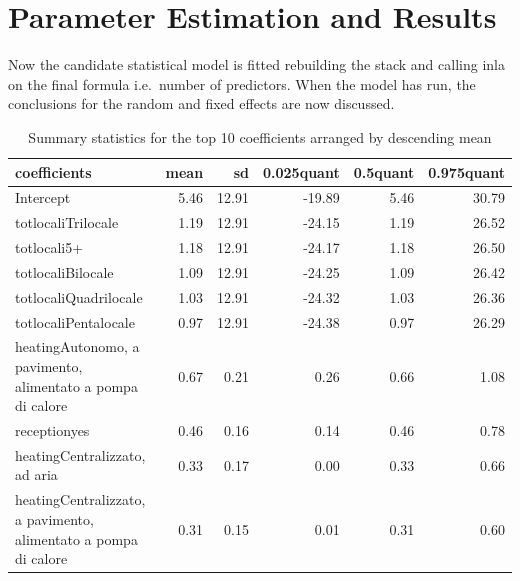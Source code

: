 \documentclass[
  12pt,
  a4paper,
  oneside]{book}
\theoremstyle{definition}
\theoremstyle{definition}
\theoremstyle{definition}
\theoremstyle{remark}
\begin{document}
\hypertarget{fit}{%
\section{Parameter Estimation and Results}\label{fit}}

Now the candidate statistical model is fitted rebuilding the stack and calling inla on the final formula i.e.~number of predictors. When the model has run, the conclusions for the random and fixed effects are now discussed.

\begin{table}

\caption{\label{tab:modelfitting}Summary statistics for the top 10 coefficients arranged by descending mean}
\centering
\begin{tabular}[t]{lrrrrr}
\toprule
coefficients & mean & sd & 0.025quant & 0.5quant & 0.975quant\\
\midrule
Intercept & 5.46 & 12.91 & -19.89 & 5.46 & 30.79\\
totlocaliTrilocale & 1.19 & 12.91 & -24.15 & 1.19 & 26.52\\
totlocali5+ & 1.18 & 12.91 & -24.17 & 1.18 & 26.50\\
totlocaliBilocale & 1.09 & 12.91 & -24.25 & 1.09 & 26.42\\
totlocaliQuadrilocale & 1.03 & 12.91 & -24.32 & 1.03 & 26.36\\
\addlinespace
totlocaliPentalocale & 0.97 & 12.91 & -24.38 & 0.97 & 26.29\\
heatingAutonomo, a pavimento, alimentato a pompa di calore & 0.67 & 0.21 & 0.26 & 0.66 & 1.08\\
receptionyes & 0.46 & 0.16 & 0.14 & 0.46 & 0.78\\
heatingCentralizzato, ad aria & 0.33 & 0.17 & 0.00 & 0.33 & 0.66\\
heatingCentralizzato, a pavimento, alimentato a pompa di calore & 0.31 & 0.15 & 0.01 & 0.31 & 0.60\\
\bottomrule
\end{tabular}
\end{table}
\end{document}
